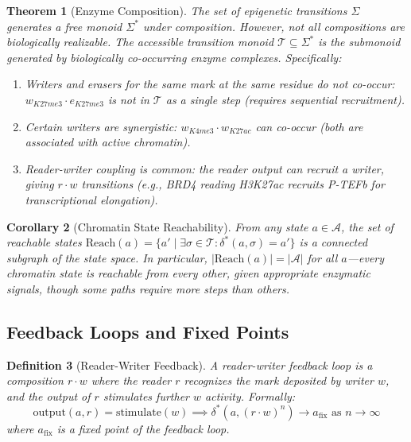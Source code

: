 \documentclass[12pt,a4paper]{article}
\newtheorem{theorem}{Theorem}[section]
\newtheorem{corollary}[theorem]{Corollary}
\newtheorem{definition}[theorem]{Definition}
\newcommand{\eg}{\textit{e.g.}}
\begin{document}
\begin{theorem}[Enzyme Composition]
\label{thm:enzyme-compose}
The set of epigenetic transitions $\Sigma$ generates a free monoid $\Sigma^*$ under composition. However, not all compositions are biologically realizable. The \emph{accessible transition monoid} $\mathcal{T} \subseteq \Sigma^*$ is the submonoid generated by biologically co-occurring enzyme complexes. Specifically:
\begin{enumerate}[label=(\roman*)]
    \item Writers and erasers for the same mark at the same residue do not co-occur: $w_{K27me3} \cdot e_{K27me3}$ is not in $\mathcal{T}$ as a single step (requires sequential recruitment).
    \item Certain writers are synergistic: $w_{K4me3} \cdot w_{K27ac}$ can co-occur (both are associated with active chromatin).
    \item Reader-writer coupling is common: the reader output can recruit a writer, giving $r \cdot w$ transitions (\eg, BRD4 reading H3K27ac recruits P-TEFb for transcriptional elongation).
\end{enumerate}
\end{theorem}

\begin{corollary}[Chromatin State Reachability]
\label{cor:reachability}
From any state $a \in \mathcal{A}$, the set of reachable states $\mathrm{Reach}(a) = \{a' \mid \exists \sigma \in \mathcal{T} : \delta^*(a, \sigma) = a'\}$ is a connected subgraph of the state space. In particular, $|\mathrm{Reach}(a)| = |\mathcal{A}|$ for all $a$---every chromatin state is reachable from every other, given appropriate enzymatic signals, though some paths require more steps than others.
\end{corollary}

\subsection{Feedback Loops and Fixed Points}

\begin{definition}[Reader-Writer Feedback]
\label{def:rw-feedback}
A \emph{reader-writer feedback loop} is a composition $r \cdot w$ where the reader $r$ recognizes the mark deposited by writer $w$, and the output of $r$ stimulates further $w$ activity. Formally:
\[
    \mathrm{output}(a, r) = \mathrm{stimulate}(w) \implies \delta^*(a, (r \cdot w)^n) \to a_{\mathrm{fix}} \text{ as } n \to \infty
\]
where $a_{\mathrm{fix}}$ is a fixed point of the feedback loop.
\end{definition}
\end{document}
